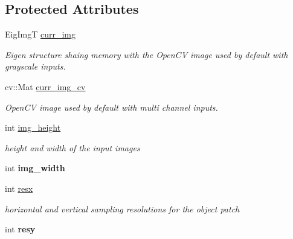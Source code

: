 \subsection*{Protected Attributes}
\begin{DoxyCompactItemize}
\item 
\hypertarget{classImageBase_a05bb3e22989361a082501f48286f58ce}{Eig\-Img\-T \hyperlink{classImageBase_a05bb3e22989361a082501f48286f58ce}{curr\-\_\-img}}\label{classImageBase_a05bb3e22989361a082501f48286f58ce}

\begin{DoxyCompactList}\small\item\em Eigen structure shaing memory with the Open\-C\-V image used by default with grayscale inputs. \end{DoxyCompactList}\item 
\hypertarget{classImageBase_a79c1a5f750185761ce3467f9eac640fe}{cv\-::\-Mat \hyperlink{classImageBase_a79c1a5f750185761ce3467f9eac640fe}{curr\-\_\-img\-\_\-cv}}\label{classImageBase_a79c1a5f750185761ce3467f9eac640fe}

\begin{DoxyCompactList}\small\item\em Open\-C\-V image used by default with multi channel inputs. \end{DoxyCompactList}\item 
\hypertarget{classImageBase_a51a4b10eff8f050199c4b69225111ad9}{int \hyperlink{classImageBase_a51a4b10eff8f050199c4b69225111ad9}{img\-\_\-height}}\label{classImageBase_a51a4b10eff8f050199c4b69225111ad9}

\begin{DoxyCompactList}\small\item\em height and width of the input images \end{DoxyCompactList}\item 
\hypertarget{classImageBase_a02e207fa46966b86c63618fbfe0192e0}{int {\bfseries img\-\_\-width}}\label{classImageBase_a02e207fa46966b86c63618fbfe0192e0}

\item 
\hypertarget{classImageBase_a4ea85cd1ec4b0655d0de1d452eb0e1ec}{int \hyperlink{classImageBase_a4ea85cd1ec4b0655d0de1d452eb0e1ec}{resx}}\label{classImageBase_a4ea85cd1ec4b0655d0de1d452eb0e1ec}

\begin{DoxyCompactList}\small\item\em horizontal and vertical sampling resolutions for the object patch \end{DoxyCompactList}\item 
\hypertarget{classImageBase_adb1512179414cadfbca54e58de914320}{int {\bfseries resy}}\label{classImageBase_adb1512179414cadfbca54e58de914320}


\end{DoxyCompactItemize}
